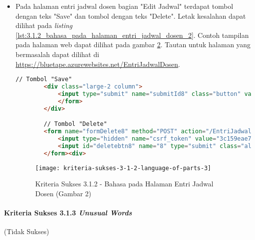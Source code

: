 \begin{itemize}
    \begin{figure}[H]
        \centering  
        \texttt{[image: kriteria-sukses-3-1-2-language-of-parts-2]}  
        \caption[Kriteria Sukses 3.1.2 - Bahasa pada Halaman Entri Jadwal Dosen (Gambar 1)]{Kriteria Sukses 3.1.2 - Bahasa pada Halaman Entri Jadwal Dosen (Gambar 1)}
        \label{fig:3.1.2_language_of_parts_2}  
    \end{figure}
    
    \item Pada halaman entri jadwal dosen bagian "Edit Jadwal" terdapat tombol dengan teks "Save" dan tombol dengan teks "Delete". Letak kesalahan dapat dilihat pada \textit{listing} \ref{lst:3.1.2_bahasa_pada_halaman_entri_jadwal_dosen_2}. Contoh tampilan pada halaman web dapat dilihat pada gambar \ref{fig:3.1.2_language_of_parts_3}. Tautan untuk halaman yang bermasalah dapat dilihat di \url{https://bluetape.azurewebsites.net/EntriJadwalDosen}.
    \begin{lstlisting}[frame=single, label={lst:3.1.2_bahasa_pada_halaman_entri_jadwal_dosen_2}, language=HTML, caption=Kriteria Sukses 3.1.2 - Bahasa yang Tidak Sesuai pada Halaman Entri Jadwal Dosen 2]
        // Tombol "Save"
        <div class="large-2 column">
            <input type="submit" name="submitId8" class="button" value="Save">
            </form>
        </div>

        // Tombol "Delete"
        <form name="formDelete8" method="POST" action="/EntriJadwalDosen/delete/8">    
            <input type="hidden" name="csrf_token" value="3c159eae7bc953dd591b679c080ed066"/>
            <input id="deletebtn8" name="8" type="submit" class="alert button" value="Delete">
        </form><div>
    \end{lstlisting}
    
    \begin{figure}[H]
        \centering  
        \texttt{[image: kriteria-sukses-3-1-2-language-of-parts-3]}  
        \caption[Kriteria Sukses 3.1.2 - Bahasa pada Halaman Entri Jadwal Dosen (Gambar 2)]{Kriteria Sukses 3.1.2 - Bahasa pada Halaman Entri Jadwal Dosen (Gambar 2)}
        \label{fig:3.1.2_language_of_parts_3}  
    \end{figure}
\end{itemize}

\paragraph{Kriteria Sukses 3.1.3 \textit{Unusual Words}}
\label{par:kepatuhan_bluetape_kriteria_sukses_3.1.3}
(Tidak Sukses)\\

